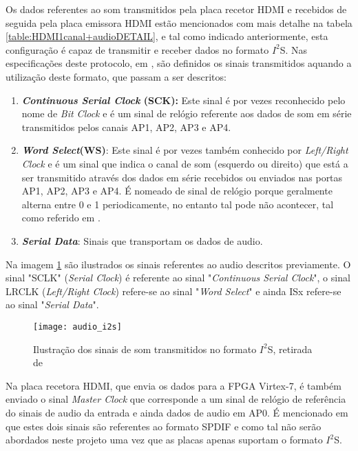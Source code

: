 Os dados referentes ao som transmitidos pela placa recetor HDMI e recebidos de seguida pela placa emissora HDMI estão mencionados com mais detalhe na tabela \ref{table:HDMI1canal+audioDETAIL}, e tal como indicado anteriormente, esta configuração é capaz de transmitir e receber dados no formato $I^{2}$S. Nas especificações deste protocolo, em \cite{R027}, são definidos os sinais transmitidos aquando a utilização deste formato, que passam a ser descritos:

\begin{enumerate}
	\item \textbf{\textit{Continuous Serial Clock} (SCK):} Este sinal é por vezes reconhecido pelo nome de \textit{Bit Clock} e é um sinal de relógio referente aos dados de som em série transmitidos pelos canais AP1, AP2, AP3 e AP4.
	
	\item \textbf{\textit{Word Select}(WS)}: Este sinal é por vezes também conhecido por \textit{Left/Right Clock} e é um sinal que indica o canal de som (esquerdo ou direito) que está a ser transmitido através dos dados em série recebidos ou enviados nas portas AP1, AP2, AP3 e AP4. É nomeado de sinal de relógio porque geralmente alterna entre 0 e 1 periodicamente, no entanto tal pode não acontecer, tal como referido em \cite{R027}. 
	
	\item \textbf{\textit{Serial Data}}: Sinais que transportam os dados de audio.

\end{enumerate}

Na imagem \ref{fig:i2s_audio} são ilustrados os sinais referentes ao audio descritos previamente. O sinal "SCLK" (\textit{Serial Clock}) é referente ao sinal "\textit{Continuous Serial Clock}", o sinal LRCLK (\textit{Left/Right Clock}) refere-se ao sinal "\textit{Word Select}" e ainda ISx refere-se ao sinal "\textit{Serial Data}".
	\begin{figure}[h!]
	\begin{center}
		\leavevmode
		\texttt{[image: audio\_i2s]}
		\caption{Ilustração dos sinais de som transmitidos no formato $I^{2}$S, retirada de \cite{R016}}
		\label{fig:i2s_audio}
	\end{center}
\end{figure}

Na placa recetora HDMI, que envia os dados para a FPGA Virtex-7, é também enviado o sinal \textit{Master Clock} que corresponde a um sinal de relógio de referência do sinais de audio da entrada e ainda dados de audio em AP0. É mencionado em \cite{R016} que estes dois sinais são referentes ao formato SPDIF e como tal não serão abordados neste projeto uma vez que as placas apenas suportam o formato $I^{2}$S.

